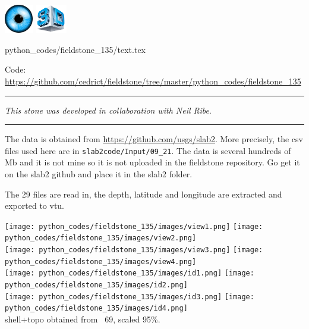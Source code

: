 \includegraphics[height=1.25cm]{images/pictograms/visualisation}
\includegraphics[height=1.25cm]{images/pictograms/3d}

\begin{flushright} {\tiny {\color{gray} python\_codes/fieldstone\_135/text.tex}} \end{flushright}

%

\begin{center}
\inpython 
Code: \url{https://github.com/cedrict/fieldstone/tree/master/python_codes/fieldstone_135}
\end{center}

\par\noindent\rule{\textwidth}{0.4pt}

{\sl This stone was developed in collaboration with Neil Ribe}. 

\par\noindent\rule{\textwidth}{0.4pt}

The data is obtained from \url{https://github.com/usgs/slab2}. More precisely,
the csv files used here are in {\tt slab2code/Input/09\_21}. The data is several hundreds of Mb
and it is not mine so it is not uploaded in the fieldstone repository. Go get 
it on the slab2 github and place it in the slab2 folder.

The 29 files are read in, the depth, latitude and longitude are extracted and exported
to vtu. 

\begin{center}
\texttt{[image: python\_codes/fieldstone\_135/images/view1.png]}
\texttt{[image: python\_codes/fieldstone\_135/images/view2.png]}\\
\texttt{[image: python\_codes/fieldstone\_135/images/view3.png]}
\texttt{[image: python\_codes/fieldstone\_135/images/view4.png]}\\
\texttt{[image: python\_codes/fieldstone\_135/images/id1.png]}
\texttt{[image: python\_codes/fieldstone\_135/images/id2.png]}\\
\texttt{[image: python\_codes/fieldstone\_135/images/id3.png]}
\texttt{[image: python\_codes/fieldstone\_135/images/id4.png]}\\
{\captionfont shell+topo obtained from \stone~69, scaled 95\%.}
\end{center}
